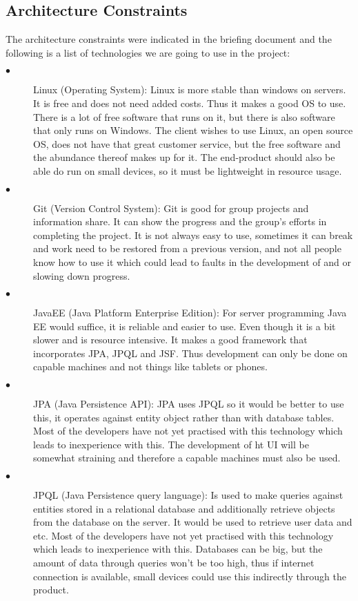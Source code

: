 \documentclass[hidelinks, 12pt]{article}
\begin{document}
\subsection{Architecture Constraints}

The architecture constraints were indicated in the briefing document and the following is a list of technologies we are going to use in the project:

\begin{description}
  \item[$\bullet$] Linux (Operating System):
  Linux is more stable than windows on servers. It is free and does not need added costs. Thus it makes a good OS to use. There is a lot of free software that runs on it, but there is also software that only runs on Windows. The client wishes to use Linux, an open source OS, does not have that great customer service, but the free software and the abundance thereof makes up for it. The end-product should also be able do run on small devices, so it must be lightweight in resource usage.
  
  \item[$\bullet$] Git (Version Control System):
  Git is good for group projects and information share. It can show the progress and the group's efforts in completing the project. It is not always easy to use, sometimes it can break and work need to be restored from a previous version, and not all people know how to use it which could lead to faults in the development of and or slowing down progress.
  
  \item[$\bullet$] JavaEE (Java Platform Enterprise Edition):
  For server programming Java EE would suffice, it is reliable and easier to use. Even though it is a bit slower and is resource intensive. It makes a good framework that incorporates JPA,  JPQL and JSF. Thus development can only be done on capable machines and not things like tablets or phones.
  
  \item[$\bullet$]JPA (Java Persistence API):
  JPA uses JPQL so it would be better to use this, it operates against entity object rather than with database tables. Most of the developers have not yet practised with this technology which leads to inexperience with this. The development of ht UI will be somewhat straining and therefore a capable machines must also be used.
  
  \item[$\bullet$] JPQL (Java Persistence query language):
  Is used to make queries against entities stored in a relational database and additionally retrieve objects from the database on the server. It would be used to retrieve user data and etc. Most of the developers have not yet practised with this technology which leads to inexperience with this. Databases can be big, but the amount of data through queries won't be too high, thus if internet connection is available, small devices could use this indirectly through the product.
  

\end{description}
\end{document}
